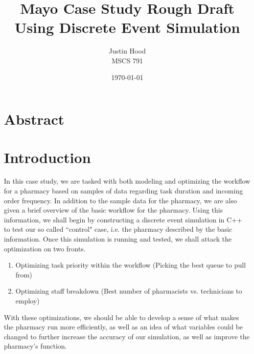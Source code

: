 \documentclass[10pt]{report}            %
\title{\bf Mayo Case Study Rough Draft\\
\large Using Discrete Event Simulation}  %
\author{Justin Hood\\
MSCS 791}              %
\date{\today}                           %
\begin{document}
\maketitle                              %
\setcounter{page}{2}                    %
\tableofcontents                        %
\newpage
\section*{Abstract}
\section*{Introduction}                %
In this case study, we are tasked with both modeling and optimizing the workflow for a pharmacy based on samples of data regarding task duration and incoming order frequency. In addition to the sample data for the pharmacy, we are also given a brief overview of the basic workflow for the pharmacy. Using this information, we shall begin by constructing a discrete event simulation in C++ to test our so called ``control" case, i.e. the pharmacy described by the basic information. Once this simulation is running and tested, we shall attack the optimization on two fronts.
\begin{enumerate}
\item Optimizing task priority within the workflow (Picking the best queue to pull from)
\item Optimizing staff breakdown (Best number of pharmacists vs. technicians to employ)
\end{enumerate}
With these optimizations, we should be able to develop a sense of what makes the pharmacy run more efficiently, as well as an idea of what variables could be changed to further increase the accuracy of our simulation, as well as improve the pharmacy's function.
\end{document}
